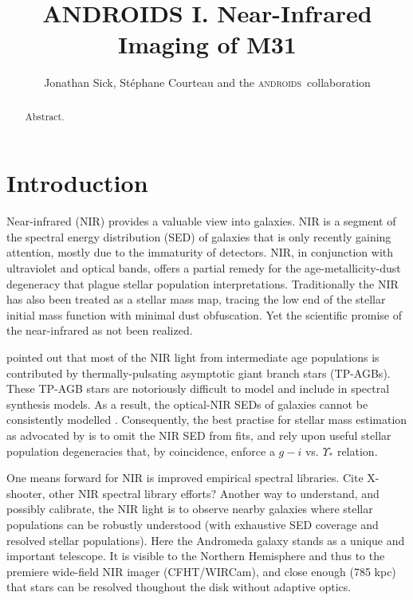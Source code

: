 \documentclass[iop]{emulateapj}
\newcommand{\androids}{\textsc{androids}}
\newcommand{\todo}[1]{\textcolor{RedOrange}{#1}} %
\begin{document}
\title{ANDROIDS I. Near-Infrared Imaging of M31}
\author{Jonathan Sick, Stéphane Courteau and the \androids\ collaboration}

\begin{abstract}
Abstract.
\end{abstract}

\section{Introduction}
\label{sec:intro}

Near-infrared (NIR) provides a valuable view into galaxies.
NIR is a segment of the spectral energy distribution (SED) of galaxies that is only recently gaining attention, mostly due to the immaturity of detectors.
NIR, in conjunction with ultraviolet and optical bands, offers a partial remedy for the age-metallicity-dust degeneracy that plague stellar population interpretations. 
Traditionally the NIR has also been treated as a stellar mass map, tracing the low end of the stellar initial mass function with minimal dust obfuscation.
Yet the scientific promise of the near-infrared as not been realized.

\cite{Maraston:1998} pointed out that most of the NIR light from intermediate age populations is contributed by thermally-pulsating asymptotic giant branch stars (TP-AGBs). These TP-AGB stars are notoriously difficult to model and include in spectral synthesis models. As a result, the optical-NIR SEDs of galaxies cannot be consistently modelled \citep{Taylor:2011}. Consequently, the best practise for stellar mass estimation as advocated by \cite{Taylor:2011} is to omit the NIR SED from fits, and rely upon useful stellar population degeneracies that, by coincidence, enforce a $g-i$ vs. $\Upsilon_*$ relation.

One means forward for NIR is improved empirical spectral libraries. 
\todo{Cite X-shooter, other NIR spectral library efforts?}
Another way to understand, and possibly calibrate, the NIR light is to observe nearby galaxies where stellar populations can be robustly understood (with exhaustive SED coverage and resolved stellar populations).
Here the Andromeda galaxy stands as a unique and important telescope.
It is visible to the Northern Hemisphere and thus to the premiere wide-field NIR imager (CFHT/WIRCam), and close enough (785 kpc) that stars can be resolved thoughout the disk without adaptive optics.
\end{document}
